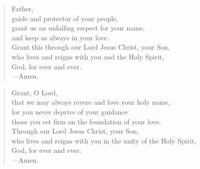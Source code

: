 \prayer

\setlength{\leftmargini}{\prayerleftmargini}

\begin{verse}
Father,\\
guide and protector of your people,\\
grant us an unfailing respect for your name,\\
and keep us always in your love.\\
Grant this through our Lord Jesus Christ, your Son,\\
who lives and reigns with you and the Holy Spirit,\\
God, for ever and ever.\\
{\color{red}---\thinspace}Amen.
\end{verse}


\begin{verse}
Grant, O Lord,\\
that we may always revere and love your holy name,\\
for you never deprive of your guidance\\
those you set firm on the foundation of your love.\\
Through our Lord Jesus Christ, your Son,\\
who lives and reigns with you in the unity of the Holy Spirit,\\
God, for ever and ever.\\
{\color{red}---\thinspace}Amen.
\end{verse}

\setlength{\leftmargini}{\defleftmargini}
